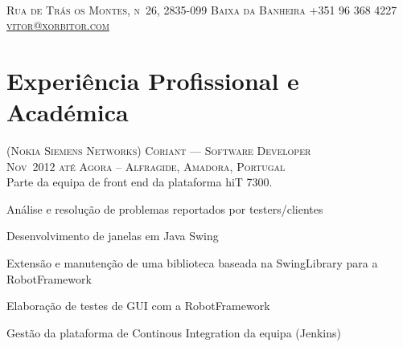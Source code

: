 \documentclass[a4paper,fontsize=10pt]{scrartcl} %
\begin{document}
\color{text1} %
\\
\textsc{\large{Rua de Trás os Montes, n\textordmasculine\ 26, 2835-099 Baixa da Banheira
{\tiny{\textcolor{bullets}{}}} +351 96 368 4227
{\tiny{\textcolor{bullets}{}}}
\href{mailto:vitor@xorbitor.com,vitor.o.matias@gmail.com}{vitor@xorbitor.com}}}\\

\color{text1}

\begin{minipage}[t]{0.5\textwidth} 
\vspace{0pt}	%

\section{Experiência Profissional e Académica}


\textsc{(Nokia Siemens Networks) Coriant --- Software Developer}\\
\small\textsc{Nov~2012 até Agora -- Alfragide, Amadora, Portugal}\\ \normalsize
Parte da equipa de front end da plataforma hiT 7300.\\
\begin{inparaitem} 
	\item[] Análise e resolu\c{c}ão de problemas reportados por testers/clientes
	\item Desenvolvimento de janelas em Java Swing
	\item Extensão e manuten\c{c}ão de uma biblioteca baseada na SwingLibrary para a RobotFramework
	\item Elaboração de testes de GUI com a RobotFramework
	\item Gestão da plataforma de Continous Integration da equipa (Jenkins)
\end{inparaitem}
\\\par



\end{minipage}
\end{document}
